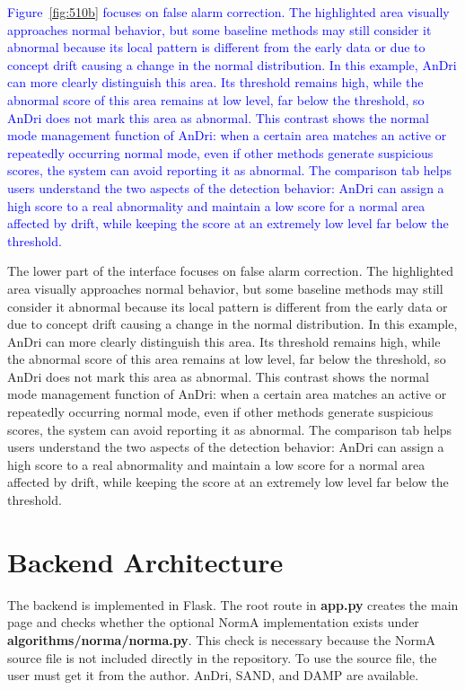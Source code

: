\textcolor{blue}{Figure~\ref{fig:510b} focuses on false alarm correction. The highlighted area visually approaches normal behavior, but some baseline methods may still consider it abnormal because its local pattern is different from the early data or due to concept drift causing a change in the normal distribution. In this example, AnDri can more clearly distinguish this area. Its threshold remains high, while the abnormal score of this area remains at low level, far below the threshold, so AnDri does not mark this area as abnormal. This contrast shows the normal mode management function of AnDri: when a certain area matches an active or repeatedly occurring normal mode, even if other methods generate suspicious scores, the system can avoid reporting it as abnormal. The comparison tab helps users understand the two aspects of the detection behavior: AnDri can assign a high score to a real abnormality and maintain a low score for a normal area affected by drift, while keeping the score at an extremely low level far below the threshold.}

The lower part  of the interface focuses on false alarm correction. The highlighted area visually approaches normal behavior, but some baseline methods may still consider it abnormal because its local pattern is different from the early data or due to concept drift causing a change in the normal distribution. In this example, AnDri can more clearly distinguish this area. Its threshold remains high, while the abnormal score of this area remains at low level, far below the threshold, so AnDri does not mark this area as abnormal. This contrast shows the normal mode management function of AnDri: when a certain area matches an active or repeatedly occurring normal mode, even if other methods generate suspicious scores, the system can avoid reporting it as abnormal. The comparison tab helps users understand the two aspects of the detection behavior: AnDri can assign a high score to a real abnormality and maintain a low score for a normal area affected by drift, while keeping the score at an extremely low level far below the threshold.




\section{Backend Architecture}
The backend is implemented in Flask. The root route in \textbf{app.py} creates the main page and checks whether the optional NormA implementation exists under \textbf{algorithms/norma/norma.py}. This check is necessary because the NormA source file is not included directly in the repository. To use the source file, the user must get it from the author. AnDri, SAND, and DAMP are available.

